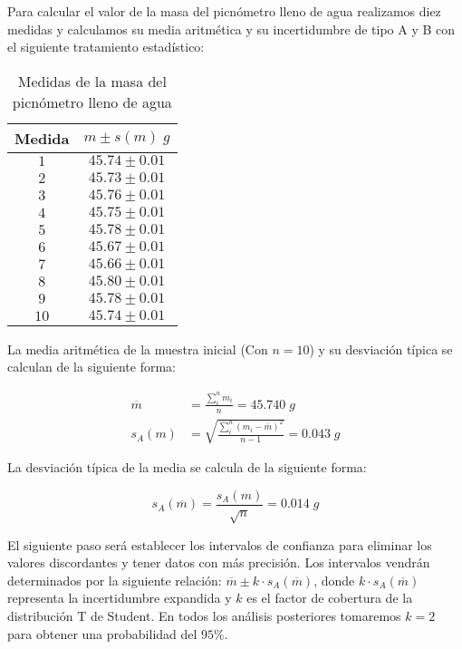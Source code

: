 \documentclass[a4paper,12pt,titlepage]{article}
\begin{document}
\par Para calcular el valor de la masa del picnómetro lleno de agua realizamos diez medidas y calculamos su media aritmética y su incertidumbre de tipo A y B con el siguiente tratamiento estadístico:

\begin{table}[h!]
    \centering
    \begin{tabular}{|c|c|}
    \hline
    Medida & $m \pm s(m)\; g$  \\ \hline
    $1$    & $45.74 \pm 0.01$ \\ \hline
    $2$    & $45.73 \pm 0.01$ \\ \hline
    $3$    & $45.76 \pm 0.01$ \\ \hline
    $4$    & $45.75 \pm 0.01$ \\ \hline
    $5$    & $45.78 \pm 0.01$ \\ \hline
    $6$    & $45.67 \pm 0.01$ \\ \hline
    $7$    & $45.66 \pm 0.01$ \\ \hline
    $8$    & $45.80 \pm 0.01$ \\ \hline
    $9$    & $45.78 \pm 0.01$ \\ \hline
    $10$   & $45.74 \pm 0.01$ \\ \hline
    \end{tabular}
    \caption{Medidas de la masa del picnómetro lleno de agua}
    \label{Pic Agua}
    \end{table}

La media aritmética de la muestra inicial (Con $n=10$) y su desviación típica se calculan de la siguiente forma:

\begin{align}
    \overline{m} &= \frac{\sum_{i}^n m_{i}}{n} = 45.740 \; g 
    \label{Media1} \\
    s_{A}(m) &= \sqrt{\frac{\sum_{i}^n (m_i-\overline{m})^2}{n-1}} = 0.043 \; g
    \label{Desviación Típica de la muestra}
\end{align}

La desviación típica de la media se calcula de la siguiente forma:

\begin{equation}
    s_{A}(\overline{m}) = \frac{s_{A}(m)}{\sqrt{n}} = 0.014 \; g
    \label{Desv_T_agua}
\end{equation}


El siguiente paso será establecer los intervalos de confianza para eliminar los valores discordantes y tener datos con más precisión. Los intervalos vendrán determinados por la siguiente relación: $\overline{m} \pm k \cdot s_{A}(\overline{m})$, donde $k \cdot s_{A}(\overline{m})$ representa la incertidumbre expandida y $k$ es el factor de cobertura de la distribución T de Student. En todos los análisis posteriores tomaremos $k=2$ para obtener una probabilidad del $95 \%$.
\end{document}
